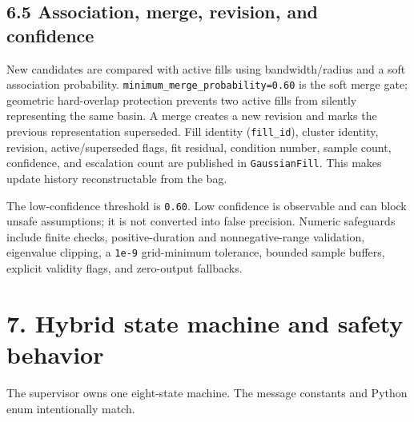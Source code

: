 \documentclass[
  10pt,
  letterpaper,
]{article}
\begin{document}
\subsection{6.5 Association, merge, revision, and confidence}\label{association-merge-revision-and-confidence}

New candidates are compared with active fills using bandwidth/radius and a
soft association probability. \nolinkurl{minimum\_merge\_probability=0.60} is the soft
merge gate; geometric hard-overlap protection prevents two active fills from
silently representing the same basin. A merge creates a new revision and
marks the previous representation superseded. Fill identity (\nolinkurl{fill\_id}),
cluster identity, revision, active/superseded flags, fit residual, condition
number, sample count, confidence, and escalation count are published in
\nolinkurl{GaussianFill}. This makes update history reconstructable from the bag.

The low-confidence threshold is \nolinkurl{0.60}. Low confidence is observable and can
block unsafe assumptions; it is not converted into false precision. Numeric
safeguards include finite checks, positive-duration and nonnegative-range
validation, eigenvalue clipping, a \nolinkurl{1e-9} grid-minimum tolerance, bounded
sample buffers, explicit validity flags, and zero-output fallbacks.

\section{7. Hybrid state machine and safety behavior}\label{hybrid-state-machine-and-safety-behavior}

The supervisor owns one eight-state machine. The message constants and Python
enum intentionally match.
\end{document}
